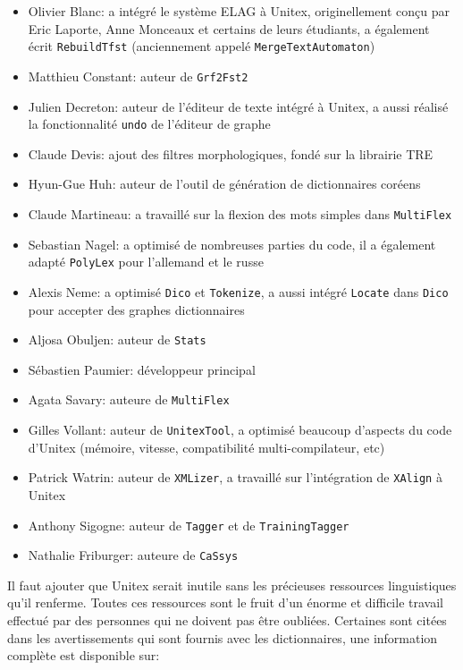 \begin{itemize}                   
    \item Olivier Blanc: a intégré le système ELAG à Unitex, originellement conçu par Eric Laporte,
    Anne Monceaux et certains de leurs étudiants, a également écrit \verb+RebuildTfst+ (anciennement
     appelé \verb+MergeTextAutomaton+)
    \item Matthieu Constant: auteur de \verb+Grf2Fst2+
    \item Julien Decreton: auteur de l'éditeur de texte intégré à Unitex,
    	    a aussi réalisé la fonctionnalité \verb+undo+ de l'éditeur de graphe
    \item Claude Devis: ajout des filtres morphologiques, fondé sur la librairie TRE
    \item Hyun-Gue Huh: auteur de l'outil de génération de dictionnaires coréens
    \item Claude Martineau: a travaillé sur la flexion des mots simples dans \verb+MultiFlex+
    \item Sebastian Nagel: a optimisé de nombreuses parties du code, il a également adapté
    	    \verb+PolyLex+ pour l'allemand et le russe
    \item Alexis Neme: a optimisé \verb+Dico+ et \verb+Tokenize+, a aussi intégré \verb+Locate+ dans \verb+Dico+ pour accepter des graphes dictionnaires
     \item Aljosa Obuljen: auteur de \verb+Stats+
     \item Sébastien Paumier: développeur principal
     \item Agata Savary: auteure de \verb+MultiFlex+
    \item Gilles Vollant: auteur de \verb+UnitexTool+, a optimisé beaucoup
    	    d'aspects du code d'Unitex (mémoire, vitesse, compatibilité multi-compilateur, etc)
    \item Patrick Watrin: auteur de \verb+XMLizer+, a travaillé sur l'intégration de \verb+XAlign+ à Unitex
    \item Anthony Sigogne: auteur de \verb+Tagger+ et de \verb+TrainingTagger+
    \item Nathalie Friburger: auteure de \verb+CaSsys+
\end{itemize}

\bigskip
\noindent Il faut ajouter que Unitex serait inutile sans les précieuses ressources linguistiques
qu'il renferme. Toutes ces ressources sont le fruit d'un énorme et difficile travail effectué par
des personnes qui ne doivent pas être oubliées. Certaines sont citées dans les avertissements qui
sont fournis avec les dictionnaires, une information complète est disponible sur:

